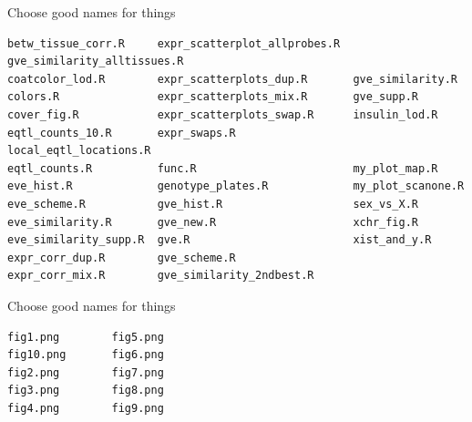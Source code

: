 \documentclass[aspectratio=169,12pt,t]{beamer}
\begin{document}
\begin{frame}[fragile,c]{Choose good names for things}

\begin{center}
\begin{minipage}[c]{13.7cm}
\begin{semiverbatim}
\lstset{basicstyle=\scriptsize}
\begin{lstlisting}[linewidth=13.7cm]
betw_tissue_corr.R     expr_scatterplot_allprobes.R  gve_similarity_alltissues.R
coatcolor_lod.R        expr_scatterplots_dup.R       gve_similarity.R
colors.R               expr_scatterplots_mix.R       gve_supp.R
cover_fig.R            expr_scatterplots_swap.R      insulin_lod.R
eqtl_counts_10.R       expr_swaps.R                  local_eqtl_locations.R
eqtl_counts.R          func.R                        my_plot_map.R
eve_hist.R             genotype_plates.R             my_plot_scanone.R
eve_scheme.R           gve_hist.R                    sex_vs_X.R
eve_similarity.R       gve_new.R                     xchr_fig.R
eve_similarity_supp.R  gve.R                         xist_and_y.R
expr_corr_dup.R        gve_scheme.R
expr_corr_mix.R        gve_similarity_2ndbest.R
\end{lstlisting}
\end{semiverbatim}
\end{minipage}
\end{center}


\end{frame}


\begin{frame}[fragile,c]{Choose good names for things}

\begin{center}
\begin{minipage}[c]{8.3cm}
\begin{semiverbatim}
\lstset{basicstyle=\normalsize}
\begin{lstlisting}[linewidth=8.3cm]
fig1.png        fig5.png
fig10.png       fig6.png
fig2.png        fig7.png
fig3.png        fig8.png
fig4.png        fig9.png
\end{lstlisting}
\end{semiverbatim}
\end{minipage}
\end{center}


\end{frame}
\end{document}
